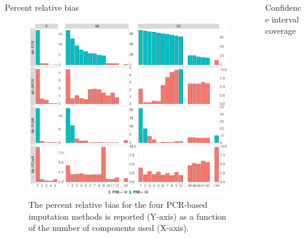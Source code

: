 \documentclass{beamer}\usepackage[]{graphicx}\usepackage[]{xcolor}
\makeatletter
\def\maxwidth{ %
  \ifdim\Gin@nat@width>\linewidth
    \linewidth
  \else
    \Gin@nat@width
  \fi
}
\newenvironment{knitrout}{}{} %
\makeatother
\begin{document}
\begin{frame}[fragile]
\begin{columns}


  \begin{column}{.46\textwidth}
    \begin{block}{Percent relative bias}

      \begin{figure}
        \centering
\begin{knitrout}
\color{fgcolor}

{\centering \includegraphics[width=\maxwidth]{figure/plot-prb-1} 

}


\end{knitrout}
          \caption{
            \label{fig:prb-text} 
            The percent relative bias for the four PCR-based imputation methods is reported (Y-axis) as a function of the number of components used (X-axis).
            }
        \end{figure}
        
    \end{block}
    
  \end{column}  


  \begin{column}{.46\textwidth}

    \begin{block}{Confidence interval coverage}
      

\end{block}
\end{column}
\end{columns}
\end{frame}
\end{document}
